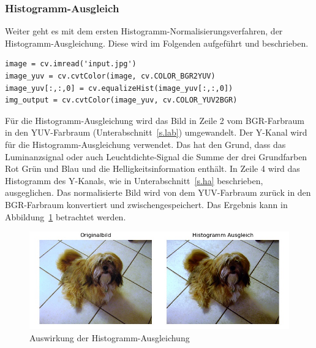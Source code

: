 \subsubsection{Histogramm-Ausgleich}
Weiter geht es mit dem ersten Histogramm-Normalisierungsverfahren, der Histogramm-Ausgleichung. Diese wird im Folgenden aufgeführt und beschrieben.\\
\begin{lstlisting}
image = cv.imread('input.jpg')
image_yuv = cv.cvtColor(image, cv.COLOR_BGR2YUV)
image_yuv[:,:,0] = cv.equalizeHist(image_yuv[:,:,0])
img_output = cv.cvtColor(image_yuv, cv.COLOR_YUV2BGR)
\end{lstlisting}
Für die Histogramm-Ausgleichung \cite{histogram2012equalisation} wird das Bild in Zeile 2 vom BGR-Farbraum in den YUV-Farbraum (Unterabschnitt~\ref{s.lab}) umgewandelt. Der Y-Kanal wird für die Histogramm-Ausgleichung verwendet. Das hat den Grund, dass das Luminanzsignal oder auch Leuchtdichte-Signal die Summe der drei Grundfarben Rot Grün und Blau und die Helligkeitsinformation enthält. In Zeile 4 wird das Histogramm des Y-Kanals, wie in Unterabschnitt~\ref{s.ha} beschrieben, ausgeglichen. Das normalisierte Bild wird von dem YUV-Farbraum zurück in den BGR-Farbraum konvertiert und zwischengespeichert. Das Ergebnis kann in Abbildung~\ref{img:histogrameq} betrachtet werden.
\begin{figure}
	[h]
	\centering
	\includegraphics[scale=0.7]{Sources/histeq.jpg}
	\caption{Auswirkung der Histogramm-Ausgleichung}
	\label{img:histogrameq}
\end{figure}	
\newpage
